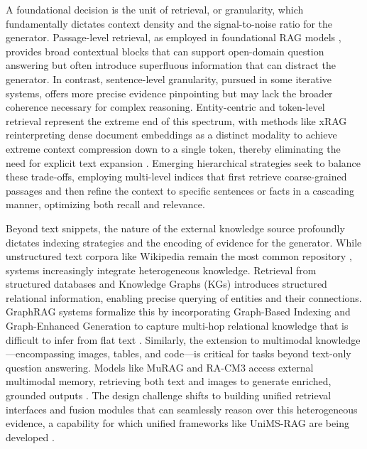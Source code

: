 \documentclass[11pt,a4paper]{article}
\begin{document}
A foundational decision is the unit of retrieval, or granularity, which fundamentally dictates context density and the signal-to-noise ratio for the generator. Passage-level retrieval, as employed in foundational RAG models \cite{arxiv:2005.11401v4}, provides broad contextual blocks that can support open-domain question answering but often introduce superfluous information that can distract the generator. In contrast, sentence-level granularity, pursued in some iterative systems, offers more precise evidence pinpointing but may lack the broader coherence necessary for complex reasoning. Entity-centric and token-level retrieval represent the extreme end of this spectrum, with methods like xRAG reinterpreting dense document embeddings as a distinct modality to achieve extreme context compression down to a single token, thereby eliminating the need for explicit text expansion \cite{arxiv:2405.13792v1}. Emerging hierarchical strategies seek to balance these trade-offs, employing multi-level indices that first retrieve coarse-grained passages and then refine the context to specific sentences or facts in a cascading manner, optimizing both recall and relevance.

Beyond text snippets, the nature of the external knowledge source profoundly dictates indexing strategies and the encoding of evidence for the generator. While unstructured text corpora like Wikipedia remain the most common repository \cite{arxiv:2005.11401v4,arxiv:2208.03299v3}, systems increasingly integrate heterogeneous knowledge. Retrieval from structured databases and Knowledge Graphs (KGs) introduces structured relational information, enabling precise querying of entities and their connections. GraphRAG systems formalize this by incorporating Graph-Based Indexing and Graph-Enhanced Generation to capture multi-hop relational knowledge that is difficult to infer from flat text \cite{arxiv:2408.08921v2}. Similarly, the extension to multimodal knowledge---encompassing images, tables, and code---is critical for tasks beyond text-only question answering. Models like MuRAG and RA-CM3 access external multimodal memory, retrieving both text and images to generate enriched, grounded outputs \cite{arxiv:2210.02928v2,arxiv:2211.12561v2}. The design challenge shifts to building unified retrieval interfaces and fusion modules that can seamlessly reason over this heterogeneous evidence, a capability for which unified frameworks like UniMS-RAG are being developed \cite{arxiv:2401.13256v1}.
\end{document}
